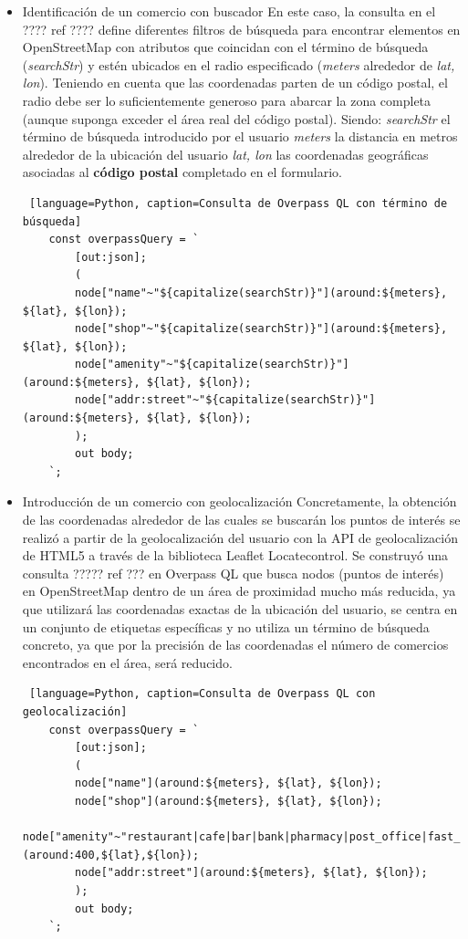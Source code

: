 \begin{itemize}
    \item Identificación de un comercio con buscador    
    En este caso, la consulta en el ???? ref ???? define diferentes filtros de búsqueda para encontrar elementos en OpenStreetMap con atributos que coincidan con el término de búsqueda (\textit{searchStr}) y estén ubicados en el radio especificado (\textit{meters} alrededor de \textit{lat, lon}). Teniendo en cuenta que las coordenadas parten de un código postal, el radio debe ser lo suficientemente generoso para abarcar la zona completa (aunque suponga exceder el área real del código postal). Siendo:
    \subitem \textit{searchStr} el término de búsqueda introducido por el usuario
    \subitem \textit{meters} la distancia en metros alrededor de la ubicación del usuario
    \subitem \textit{lat, lon} las coordenadas geográficas asociadas al \textbf{código postal} completado en el formulario.
    
    \begin{lstlisting} [language=Python, caption=Consulta de Overpass QL con término de búsqueda]
    const overpassQuery = `
        [out:json];
        (
        node["name"~"${capitalize(searchStr)}"](around:${meters}, ${lat}, ${lon});
        node["shop"~"${capitalize(searchStr)}"](around:${meters}, ${lat}, ${lon});
        node["amenity"~"${capitalize(searchStr)}"](around:${meters}, ${lat}, ${lon});
        node["addr:street"~"${capitalize(searchStr)}"](around:${meters}, ${lat}, ${lon});
        );
        out body;
    `;
    \end{lstlisting}

    \item Introducción de un comercio con geolocalización 
    Concretamente, la obtención de las coordenadas alrededor de las cuales se buscarán los puntos de interés se realizó a partir de la geolocalización del usuario con la API de geolocalización de HTML5 a través de la biblioteca Leaflet Locatecontrol. Se construyó una consulta ????? ref ??? en Overpass QL que busca nodos (puntos de interés) en OpenStreetMap dentro de un área de proximidad mucho más reducida, ya que utilizará las coordenadas exactas de la ubicación del usuario, se centra en un conjunto de etiquetas específicas y no utiliza un término de búsqueda concreto, ya que por la precisión de las coordenadas el número de comercios encontrados en el área, será reducido.
    \begin{lstlisting} [language=Python, caption=Consulta de Overpass QL con geolocalización]
    const overpassQuery = `
        [out:json];
        (
        node["name"](around:${meters}, ${lat}, ${lon});
        node["shop"](around:${meters}, ${lat}, ${lon});
        node["amenity"~"restaurant|cafe|bar|bank|pharmacy|post_office|fast_food|clinic|vending_machine"](around:400,${lat},${lon});
        node["addr:street"](around:${meters}, ${lat}, ${lon});               
        );
        out body;
    `;
    \end{lstlisting}

\end{itemize}

